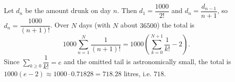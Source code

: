 Let $d_n$ be the amount drunk on day $n$. Then $d_1=\dfrac{1000}{2!}$ and $d_n=\dfrac{d_{n-1}}{n+1}$, so $d_n=\dfrac{1000}{(n+1)!}$. Over $N$ days (with $N$ about $36500$) the total is
\[1000\sum_{n=1}^{N}\dfrac1{(n+1)!}=1000\left(\sum_{k=0}^{N+1}\dfrac1{k!}-2\right).\]
Since $\sum_{k\ge0}\dfrac1{k!}=e$ and the omitted tail is astronomically small, the total is $1000(e-2)\approx1000\cdot0.71828=718.28$ litres, i.e. $\boxed{718}$.
